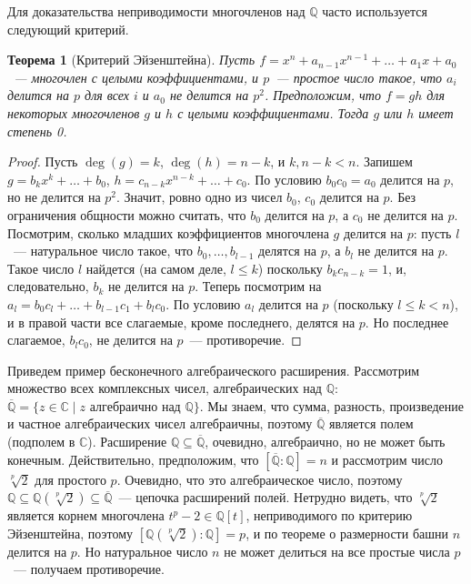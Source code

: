 \documentclass[a4paper,11pt]{scrartcl}
\theoremstyle{plain}
\newtheorem{theorem}{Теорема}[subsection]
\theoremstyle{definition}
\newcommand\mb{\mathbb}
\newcommand\sseq{\subseteq}
\begin{document}
Для доказательства неприводимости многочленов над $\mb Q$ часто
используется следующий критерий.

\begin{theorem}[Критерий Эйзенштейна]
Пусть $f=x^n+a_{n-1}x^{n-1}+\dots+a_1x+a_0$~--- многочлен с целыми
коэффициентами, и $p$~--- простое число такое, что $a_i$ делится на
$p$ для всех $i$ и $a_0$ не делится на $p^2$. Предположим, что $f=gh$
для некоторых многочленов $g$ и $h$ с целыми коэффициентами. Тогда $g$
или $h$ имеет степень 0.
\end{theorem}
\begin{proof}
Пусть $\deg(g)=k$, $\deg(h)=n-k$, и $k,n-k<n$. Запишем
$g=b_kx^k+\dots+b_0$, $h=c_{n-k}x^{n-k}+\dots+c_0$.
По условию $b_0c_0=a_0$ делится на $p$, но не делится на
$p^2$. Значит, ровно одно из чисел $b_0$, $c_0$ делится на $p$. Без
ограничения общности можно считать, что $b_0$ делится на $p$, а $c_0$
не делится на $p$. Посмотрим, сколько младших коэффициентов многочлена
$g$ делится на $p$: пусть $l$~--- натуральное число такое, что
$b_0,\dots,b_{l-1}$ делятся на $p$, а $b_l$ не делится на $p$. Такое
число $l$ найдется (на самом деле, $l\leq k$)
поскольку $b_kc_{n-k}=1$, и, следовательно, $b_k$
не делится на $p$. Теперь посмотрим на
$a_l=b_0c_l+\dots+b_{l-1}c_1+b_lc_0$. По условию $a_l$ делится на $p$
(поскольку $l\leq k<n$),
и в правой части все слагаемые, кроме последнего, делятся на $p$. Но
последнее слагаемое, $b_lc_0$, не делится на $p$~--- противоречие.
\end{proof}

Приведем пример бесконечного алгебраического расширения. Рассмотрим
множество всех комплексных чисел, алгебраических над $\mb Q$:
$\overline{\mb Q}=\{z\in\mb C\mid z\text{ алгебраично над }\mb Q\}$.
Мы знаем, что сумма, разность, произведение и частное алгебраических
чисел алгебраичны, поэтому $\overline{\mb Q}$ является полем (подполем
в $\mb C$). Расширение $\mb Q\sseq\overline{\mb Q}$, очевидно,
алгебраично, но не может быть конечным. Действительно, предположим,
что $[\overline{\mb Q}:\mb Q]=n$ и рассмотрим число $\sqrt[p]{2}$ для
простого $p$. Очевидно, что это алгебраическое число, поэтому $\mb
Q\sseq \mb Q(\sqrt[p]{2})\sseq\overline{\mb Q}$~--- цепочка расширений
полей. Нетрудно видеть, что $\sqrt[p]{2}$ является корнем многочлена
$t^p-2\in\mb Q[t]$, неприводимого по критерию Эйзенштейна, поэтому
$[\mb Q(\sqrt[p]{2}):\mb Q]=p$, и по теореме о размерности башни $n$
делится на $p$. Но натуральное число $n$ не может делиться на
все простые числа $p$~--- получаем противоречие.
\end{document}
